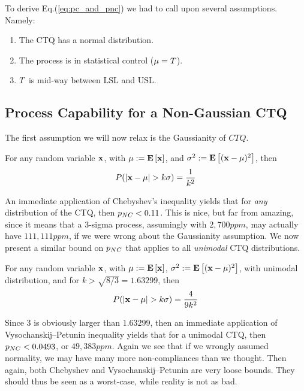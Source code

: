 To derive Eq.(\ref{eq:pc_and_pnc}) we had to call upon several assumptions.
Namely:
\begin{enumerate}
\item The CTQ has a normal distribution.
\item The process is in statistical control ($\mu=T$).
\item $T$ is mid-way between LSL and USL.
\end{enumerate}





\subsection{Process Capability for a Non-Gaussian CTQ}
The first assumption we will now relax is the Gaussianity of $CTQ$. 

\begin{theorem}
For any random variable $\mathbf{x}$, with $\mu:=\mathbf{E}\left[ \mathbf{x} \right]$, and $\sigma^2:=\mathbf{E}\left[ (\mathbf{x}-\mu)^2 \right]$, then
\begin{align}
	P(|\x-\mu|>k\sigma)=\frac{1}{k^2}
\end{align}
\end{theorem}
An immediate application of Chebyshev's inequality yields that for \emph{any} distribution of the CTQ, then $p_{NC}<0.11$.
This is nice, but far from amazing, since it means that a 3-sigma process, assumingly with $2,700 ppm$, may actually have $111,111 ppm$, if we were wrong about the Gaussianity assumption.
We now present a similar bound on $p_{NC}$ that applies to all \emph{unimodal} CTQ distributions.

\begin{theorem}
For any random variable $\mathbf{x}$, with $\mu:=\mathbf{E}\left[ \mathbf{x} \right]$, $\sigma^2:=\mathbf{E}\left[ (\mathbf{x}-\mu)^2 \right]$, with unimodal distribution, and for $k>\sqrt{8/3}=1.63299$, then 
\begin{align}
	P(|\x-\mu|>k\sigma)=\frac{4}{9 k^2}
\end{align}
\end{theorem}
Since $3$ is obviously larger than $1.63299$, then an immediate application of Vysochanskij–Petunin inequality yields that for a unimodal CTQ, then $p_{NC}<0.0493$, or $49,383 ppm$.
Again we see that if we wrongly assumed normality, we may have many more non-compliances than we thought. Then again, both Chebyshev and Vysochanskij–Petunin are very loose bounds. 
They should thus be seen as a worst-case, while reality is not as bad.

